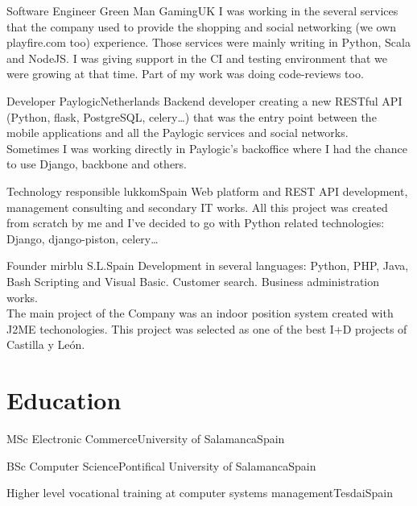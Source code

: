 \documentclass[11pt, a4paper, sans]{moderncv}
\begin{document}
{Software Engineer}
{Green Man Gaming}{UK}{}
{I was working in the several services that the company used to provide the
shopping and social networking (we own playfire.com too) experience. Those
services were mainly writing in Python, Scala and NodeJS. I was giving support
in the CI and testing environment that we were growing at that time. Part of my
work was doing code-reviews too.\\}

{Developer}
{Paylogic}{Netherlands}{}
{Backend developer creating a new RESTful API (Python, flask, PostgreSQL,
celery\ldots) that was the entry point between the mobile applications and all
the Paylogic services and social networks.\\Sometimes I was working directly in
Paylogic's backoffice where I had the chance to use Django, backbone and others.\\}

{Technology responsible}
{lukkom}{Spain}{}
{Web platform and REST API development, management consulting and secondary IT
works. All this project was created from scratch by me and I've decided to go
with Python related technologies: Django, django-piston, celery\ldots\\}

{Founder}
{mirblu S.L.}{Spain}{}
{Development in several languages: Python, PHP, Java, Bash Scripting and Visual
Basic. Customer search. Business administration works.\\The main project of the
Company was an indoor position system created with J2ME techonologies. This
project was selected as one of the best I+D projects of Castilla y León.\\}


%
%

\section{Education}
{MSc Electronic Commerce}{University of Salamanca}{Spain}{}{}

{BSc Computer Science}{Pontifical University of Salamanca}{Spain}{}{}

{Higher level vocational training at computer systems management}{Tesdai}{Spain}{}{}
\end{document}
